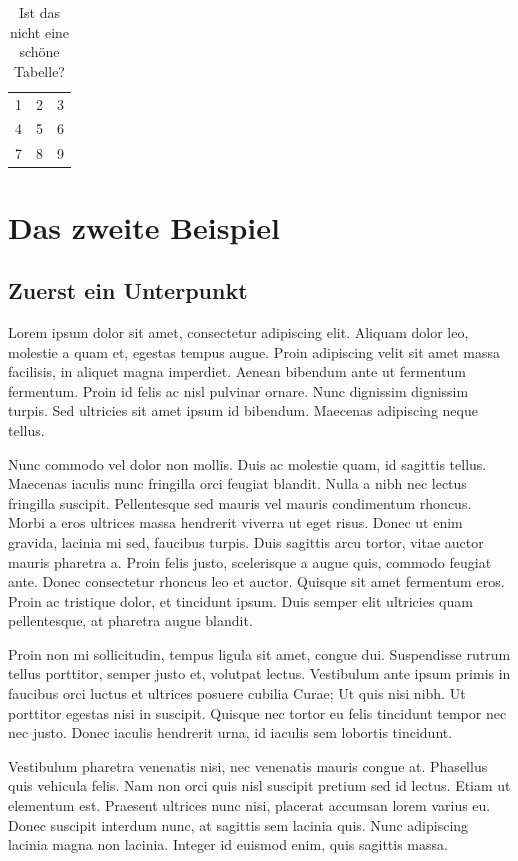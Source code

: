\begin{table}
	\centering
	\begin{tabular}{| l c r |}
		\hline
		1 & 2 & 3 \\
		4 & 5 & 6 \\
		7 & 8 & 9 \\
		\hline
	\end{tabular}
	\caption{Ist das nicht eine schöne Tabelle?}
\end{table}

\section{Das zweite Beispiel}

\subsection{Zuerst ein Unterpunkt}
Lorem ipsum dolor sit amet, consectetur adipiscing elit. Aliquam dolor leo, molestie a quam et, egestas tempus augue. Proin adipiscing velit sit amet massa facilisis, in aliquet magna imperdiet. Aenean bibendum ante ut fermentum fermentum. Proin id felis ac nisl pulvinar ornare. Nunc dignissim dignissim turpis. Sed ultricies sit amet ipsum id bibendum. Maecenas adipiscing neque tellus.

Nunc commodo vel dolor non mollis. Duis ac molestie quam, id sagittis tellus. Maecenas iaculis nunc fringilla orci feugiat blandit. Nulla a nibh nec lectus fringilla suscipit. Pellentesque sed mauris vel mauris condimentum rhoncus. Morbi a eros ultrices massa hendrerit viverra ut eget risus. Donec ut enim gravida, lacinia mi sed, faucibus turpis. Duis sagittis arcu tortor, vitae auctor mauris pharetra a. Proin felis justo, scelerisque a augue quis, commodo feugiat ante. Donec consectetur rhoncus leo et auctor. Quisque sit amet fermentum eros. Proin ac tristique dolor, et tincidunt ipsum. Duis semper elit ultricies quam pellentesque, at pharetra augue blandit.

Proin non mi sollicitudin, tempus ligula sit amet, congue dui. Suspendisse rutrum tellus porttitor, semper justo et, volutpat lectus. Vestibulum ante ipsum primis in faucibus orci luctus et ultrices posuere cubilia Curae; Ut quis nisi nibh. Ut porttitor egestas nisi in suscipit. Quisque nec tortor eu felis tincidunt tempor nec nec justo. Donec iaculis hendrerit urna, id iaculis sem lobortis tincidunt.

Vestibulum pharetra venenatis nisi, nec venenatis mauris congue at. Phasellus quis vehicula felis. Nam non orci quis nisl suscipit pretium sed id lectus. Etiam ut elementum est. Praesent ultrices nunc nisi, placerat accumsan lorem varius eu. Donec suscipit interdum nunc, at sagittis sem lacinia quis. Nunc adipiscing lacinia magna non lacinia. Integer id euismod enim, quis sagittis massa.

